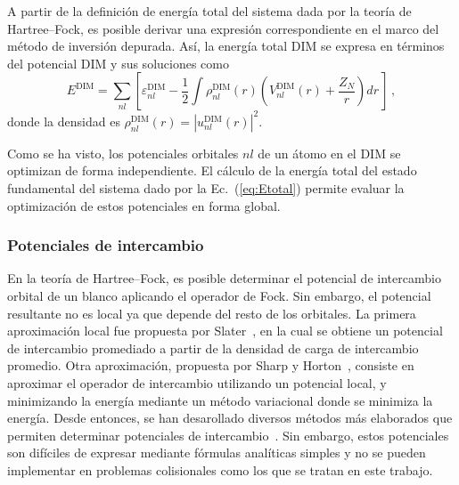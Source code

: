 A partir de la definición de energía total del sistema dada por la 
teoría de Hartree--Fock, es posible derivar una expresión 
correspondiente en el marco del método de inversión depurada. Así, la 
energía total DIM se expresa en términos del potencial DIM y sus 
soluciones como
\begin{equation}
E^{\mathrm{DIM}} = \sum\limits_{nl} 
\left[ 
\varepsilon_{nl}^{\mathrm{DIM}} - 
\frac{1}{2}\int  \rho_{nl}^{\mathrm{DIM}}(r)
\left( V_{nl}^{\mathrm{DIM}}(r) + \frac{Z_{N}}{r}\right) dr \,
\right] \, ,
\label{eq:Etotal}
\end{equation}
donde la densidad es 
$\rho_{nl}^{\mathrm{DIM}}(r)=|u_{nl}^{\mathrm{DIM}}(r)|^2$. 

Como se ha visto, los potenciales orbitales $nl$ de un átomo en el DIM 
se optimizan de forma independiente. El cálculo de la energía total del 
estado fundamental del sistema dado por la Ec.~(\ref{eq:Etotal}) permite 
evaluar la optimización de estos potenciales en forma global.

\subsubsection*{Potenciales de intercambio}

En la teoría de Hartree--Fock, es posible determinar el potencial de 
intercambio orbital de un blanco aplicando el operador de Fock. Sin 
embargo, el potencial resultante no es local ya que depende del resto de 
los orbitales. La primera aproximación local fue propuesta por 
Slater~\cite{Slater:51}, en la cual se obtiene un potencial de 
intercambio promediado a partir de la densidad de carga de intercambio 
promedio. Otra aproximación, propuesta por Sharp y 
Horton~\cite{Sharp:53}, consiste en aproximar el operador de intercambio 
utilizando un potencial local, y minimizando la energía mediante un 
método variacional donde se minimiza 
la energía. Desde entonces, se han desarollado diversos métodos más 
elaborados que permiten determinar potenciales de 
intercambio~\cite{Krieger:92,Gorling:92,Yang:02,Staroverov:06,
Ryabinkin:13}. Sin embargo, estos potenciales son difíciles de expresar 
mediante fórmulas analíticas simples y no se pueden implementar en 
problemas colisionales como los que se tratan en este trabajo.

